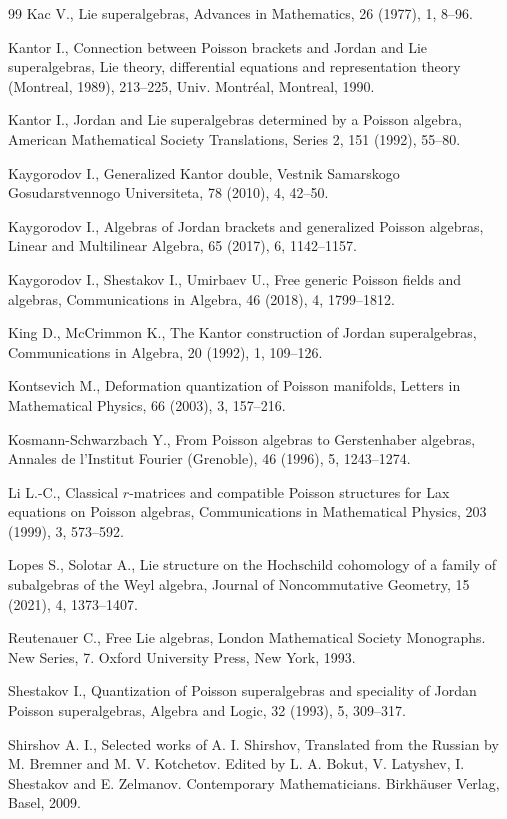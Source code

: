 \documentclass[11pt,reqno]{amsart}
\theoremstyle{plain}
\theoremstyle{definition}
\theoremstyle{remark}
\begin{document}
\begin{thebibliography}{99}
Kac V.,
Lie superalgebras,
Advances in Mathematics, 26 (1977), 1, 8--96.

Kantor I.,
Connection between Poisson brackets and Jordan and Lie superalgebras,
Lie theory, differential equations and representation theory (Montreal, 1989), 213--225, Univ. Montr\'eal, Montreal, 1990.

Kantor I.,
Jordan and Lie superalgebras determined by a Poisson algebra,
American Mathematical Society Translations, Series 2, 151 (1992), 55--80.

Kaygorodov I.,
Generalized Kantor double,
Vestnik Samarskogo Gosudarstvennogo Universiteta, 78 (2010), 4, 42--50.

Kaygorodov I.,
Algebras of Jordan brackets and generalized Poisson algebras,
Linear and Multilinear Algebra, 65 (2017), 6, 1142--1157.

Kaygorodov I., Shestakov I., Umirbaev U.,
Free generic Poisson fields and algebras,
Communications in Algebra, 46 (2018), 4, 1799--1812.

King D., McCrimmon K.,
The Kantor construction of Jordan superalgebras,
Communications in Algebra, 20 (1992), 1, 109--126.

Kontsevich M.,
Deformation quantization of Poisson manifolds,
Letters in Mathematical Physics, 66 (2003), 3, 157--216.

Kosmann-Schwarzbach Y.,
From Poisson algebras to Gerstenhaber algebras,
Annales de l'Institut Fourier (Grenoble), 46 (1996), 5, 1243--1274.

Li L.-C.,
Classical $r$-matrices and compatible Poisson structures for Lax equations on Poisson algebras,
Communications in Mathematical Physics, 203 (1999), 3, 573--592.

Lopes S., Solotar A.,
Lie structure on the Hochschild cohomology of a family of subalgebras of the Weyl algebra,
Journal of Noncommutative Geometry, 15 (2021), 4, 1373--1407.

Reutenauer C.,
Free Lie algebras,
London Mathematical Society Monographs. New Series, 7. Oxford University Press, New York, 1993.

Shestakov I.,
Quantization of Poisson superalgebras and speciality of Jordan Poisson superalgebras,
Algebra and Logic, 32 (1993), 5, 309--317.

Shirshov A. I.,
Selected works of A. I. Shirshov,
Translated from the Russian by M. Bremner and M. V. Kotchetov. Edited by L. A. Bokut, V. Latyshev, I. Shestakov and E. Zelmanov. Contemporary Mathematicians. Birkh\"auser Verlag, Basel, 2009.


\end{thebibliography}
\end{document}
